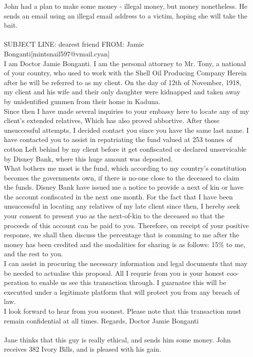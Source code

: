 \documentclass{article}
\begin{document}
John had a plan to make some money {-} illegal money, but money nonetheless.
He sends an email using an illegal email address to a victim, hoping she will take the bait.
\\\\
SUBJECT LINE: dearest friend
FROM: Jamie Bonganti[mintsnail597@vmail.cyan]
\\
I am Doctor Jamie Bonganti.
I am the personal attorney to Mr. Tony, a national of your country, who used to work with the Shell Oil Producing Company
Herein after he will be referred to as my client.
On the day of 12th of November, 1918, my client and his wife and their only daughter were kidnapped and taken away by unidentified gunmen from their home in Kaduna.
\\
Since then I have made several inquiries to your embassy here to locate any of my client's extended relatives, Which has also proved abbortive.
After these unsuccessful attempts, I decided contact you since you have the same last name.
I have contacted you to assist in repatriating the fund valued at 253 tonnes of cotton Left behind by my client before it get confiscated or declared unservicable by Disney Bank, where this huge amount was deposited.
\\
What bothers me most is the fund, which according to my country's constitution becomes the governments own, if there is no{-}one close to the deceased to claim the funds.
Disney Bank have issued me a notice to provide a next of kin or have the account confiscated in the next one month.
For the fact that I have been unsuccessful in locating any relatives of my late client since then, I hereby seek your consent to present yuo as the next{-}of{-}kin to the deceased so that the proceeds of this account can be paid to you.
Therefore, on receipt of your positive response, we shall then discuss the percentage that is comming to me after the money has been credited and the modalities for sharing is as follows: 15\% to me, and the rest to you.
\\
I can assist in procuring the necessary information and legal documents that may be needed to actualise this proposal.
All I requrie from you is your honest coo{-}peration to enable us see this transaction through.
I guarnatee this will be executted under a legitimate platform that will protect you from any breach of law.
\\
I look forward to hear from you soonest.
Please note that this transaction must remain confidential at all times.
Regards, Doctor Jamie Bonganti
\\\\
Jane thinks that this guy is really ethical, and sends him some money.
John receives 382 Ivory Bills, and is pleased with his gain.
\end{document}
